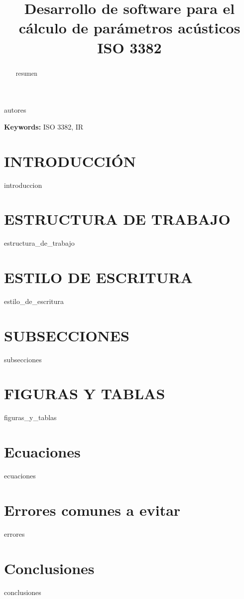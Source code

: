\documentclass[10pt, a4paper]{article} %
\begin{document}

    \title{\huge{Desarrollo de software para el cálculo de parámetros acústicos ISO 3382}} %
    \date{}
    {autores} %
    \maketitle %
    \begin{abstract} %
        {resumen}
    \end{abstract}
    
    \textbf{Keywords:} ISO 3382, IR \smallskip  %
    
    \begin{multicols}{2} %
        \section{INTRODUCCIÓN}
            {introduccion}
    
        \section{ESTRUCTURA DE TRABAJO}
            {estructura_de_trabajo} %
        
        \section{ESTILO DE ESCRITURA}
            {estilo_de_escritura} 
            
         \section{SUBSECCIONES}
             {subsecciones} 
                
         \section{FIGURAS Y TABLAS}       
            {figuras_y_tablas} 
            
        \section{Ecuaciones}
            {ecuaciones} 
        
        \section{Errores comunes a evitar}
            {errores} 
        
        \section{Conclusiones}
            {conclusiones} 

        
        
        
    \end{multicols}
\end{document}
